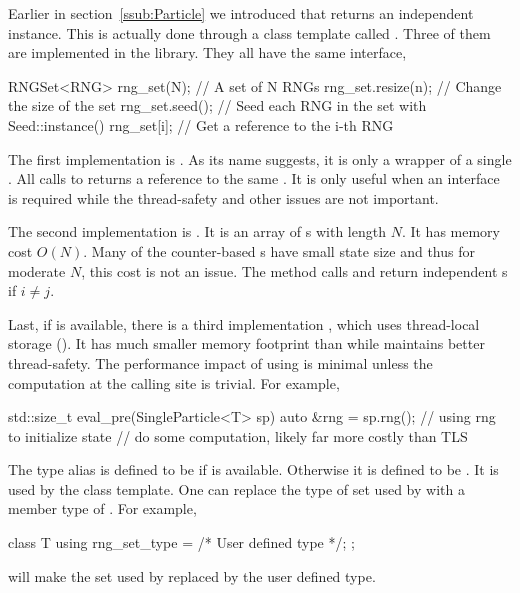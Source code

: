 \documentclass[11pt,bib,mint,hyper,altcolor]{marticle}
\begin{document}
Earlier in section~\ref{ssub:Particle} we introduced that
 returns an independent \rng instance. This is
actually done through a class template called . Three of them
are implemented in the library. They all have the same interface,
\begin{cppcode}
  RNGSet<RNG> rng_set(N); // A set of N RNGs
  rng_set.resize(n);      // Change the size of the set
  rng_set.seed();         // Seed each RNG in the set with Seed::instance()
  rng_set[i];             // Get a reference to the i-th RNG
\end{cppcode}
The first implementation is . As its name suggests, it
is only a wrapper of a single \rng. All calls to  returns
a reference to the same \rng. It is only useful when an 
interface is required while the thread-safety and other issues are not
important.

The second implementation is . It is an array of
\rng{}s with length $N$. It has memory cost $O(N)$. Many of the counter-based
\rng{}s have small state size and thus for moderate $N$, this cost is not an
issue. The method calls  and 
return independent \rng{}s if $i \ne j$.

Last, if \tbb is available, there is a third implementation
, which uses thread-local storage (\tls). It has much
smaller memory footprint than  while maintains better
thread-safety. The performance impact of using \tls is minimal unless the
computation at the calling site is trivial. For example,
\begin{cppcode}
  std::size_t eval_pre(SingleParticle<T> sp)
  {
      auto &rng = sp.rng();
      // using rng to initialize state
      // do some computation, likely far more costly than TLS
  }
\end{cppcode}
The type alias  is defined to be  if
\tbb is available. Otherwise it is defined to be . It
is used by the  class template. One can replace the type of
\rng set used by  with a member type of .
For example,
\begin{cppcode}
  class T
  {
      using rng_set_type = /* User defined type */;
  };
\end{cppcode}
will make the \rng set used by  replaced by the user
defined type.
\end{document}
